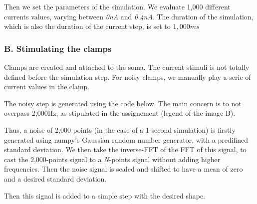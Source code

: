 \documentclass[]{article}
\begin{document}
Then we set the parameters of the simulation. We evaluate 1,000
different currents values, varying between \emph{0nA} and \emph{0.4nA}.
The duration of the simulation, which is also the duration of the
current step, is set to \(1,000ms\)

\hypertarget{b.-stimulating-the-clamps}{%
\subsubsection{B. Stimulating the
clamps}\label{b.-stimulating-the-clamps}}

Clamps are created and attached to the soma. The current stimuli is not
totally defined before the simulation step. For noisy clamps, we
manually play a serie of current values in the clamp.

The noisy step is generated using the code below. The main concern is to
not overpass 2,000Hz, as stipulated in the assignement (legend of the
image B).

Thus, a noise of 2,000 points (in the case of a 1-second simulation) is
firstly generated using numpy's Gaussian random number generator, with a
predifined standard deviation. We then take the inverse-FFT of the FFT
of this signal, to cast the 2,000-points signal to a \emph{N}-points
signal without adding higher frequencies. Then the noise signal is
scaled and shifted to have a mean of zero and a desired standard
deviation.

Then this signal is added to a simple step with the desired shape.
\end{document}
